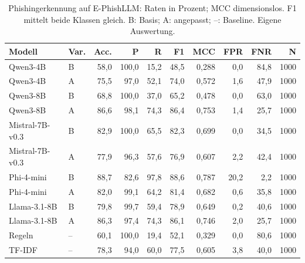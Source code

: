 \begin{table}[htbp]
\centering\scriptsize
\caption{Phishingerkennung auf E-PhishLLM: Raten in Prozent; MCC dimensionslos. F1 mittelt beide Klassen gleich. B: Basis; A: angepasst; –: Baseline. Eigene Auswertung.}
\label{tab:result-phishing-1}
\begin{tabular}{llrrrrrrrr}
\toprule
Modell & Var. & Acc. & P & R & F1 & MCC & FPR & FNR & N \\
\midrule
Qwen3-4B & B & 58{,}0 & 100{,}0 & 15{,}2 & 48{,}5 & 0{,}288 & 0{,}0 & 84{,}8 & 1000 \\
Qwen3-4B & A & 75{,}5 & 97{,}0 & 52{,}1 & 74{,}0 & 0{,}572 & 1{,}6 & 47{,}9 & 1000 \\
Qwen3-8B & B & 68{,}8 & 100{,}0 & 37{,}0 & 65{,}2 & 0{,}478 & 0{,}0 & 63{,}0 & 1000 \\
Qwen3-8B & A & 86{,}6 & 98{,}1 & 74{,}3 & 86{,}4 & 0{,}753 & 1{,}4 & 25{,}7 & 1000 \\
Mistral-7B-v0.3 & B & 82{,}9 & 100{,}0 & 65{,}5 & 82{,}3 & 0{,}699 & 0{,}0 & 34{,}5 & 1000 \\
Mistral-7B-v0.3 & A & 77{,}9 & 96{,}3 & 57{,}6 & 76{,}9 & 0{,}607 & 2{,}2 & 42{,}4 & 1000 \\
Phi-4-mini & B & 88{,}7 & 82{,}6 & 97{,}8 & 88{,}6 & 0{,}787 & 20{,}2 & 2{,}2 & 1000 \\
Phi-4-mini & A & 82{,}0 & 99{,}1 & 64{,}2 & 81{,}4 & 0{,}682 & 0{,}6 & 35{,}8 & 1000 \\
Llama-3.1-8B & B & 79{,}8 & 99{,}7 & 59{,}4 & 78{,}9 & 0{,}649 & 0{,}2 & 40{,}6 & 1000 \\
Llama-3.1-8B & A & 86{,}3 & 97{,}4 & 74{,}3 & 86{,}1 & 0{,}746 & 2{,}0 & 25{,}7 & 1000 \\
Regeln & – & 60{,}1 & 100{,}0 & 19{,}4 & 52{,}1 & 0{,}329 & 0{,}0 & 80{,}6 & 1000 \\
TF-IDF & – & 78{,}3 & 94{,}0 & 60{,}0 & 77{,}5 & 0{,}605 & 3{,}8 & 40{,}0 & 1000 \\
\bottomrule
\end{tabular}
\end{table}

